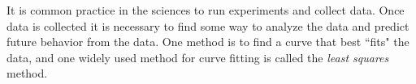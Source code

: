  \label{sec:R_n}

\vspace*{-17 pt}

\vspace*{13 pt}


It is common practice in the sciences to run experiments and collect data. Once data is collected it is necessary to find some way to analyze the data and predict future behavior from the data. One method is to find a curve that best ``fits" the data, and one widely used method for curve fitting is called the \emph{least squares} method.

